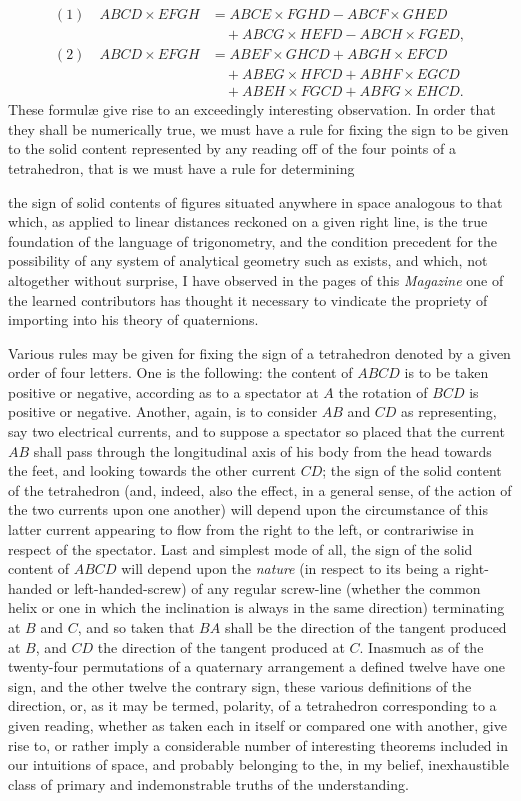 \documentclass[11pt]{article}
\newcommand{\sourcepage}[1]{\marginpar{\scriptsize p.~#1}}
\begin{document}
{{\[
\begin{aligned}
(1)\quad ABCD\times EFGH&=ABCE\times FGHD-ABCF\times GHED\\
&\quad+ABCG\times HEFD-ABCH\times FGED,\\
(2)\quad ABCD\times EFGH&=ABEF\times GHCD+ABGH\times EFCD\\
&\quad+ABEG\times HFCD+ABHF\times EGCD\\
&\quad+ABEH\times FGCD+ABFG\times EHCD.
\end{aligned}
\]
These formulæ give rise to an exceedingly interesting observation. In order that they shall be numerically true, we must have a rule for fixing the sign to be given to the solid content represented by any reading off of the four points of a tetrahedron, that is we must have a rule for determining

\sourcepage{391}
the sign of solid contents of figures situated anywhere in space analogous to that which, as applied to linear distances reckoned on a given right line, is the true foundation of the language of trigonometry, and the condition precedent for the possibility of any system of analytical geometry such as exists, and which, not altogether without surprise, I have observed in the pages of this \emph{Magazine} one of the learned contributors has thought it necessary to vindicate the propriety of importing into his theory of quaternions.

Various rules may be given for fixing the sign of a tetrahedron denoted by a given order of four letters. One is the following: the content of $ABCD$ is to be taken positive or negative, according as to a spectator at $A$ the rotation of $BCD$ is positive or negative. Another, again, is to consider $AB$ and $CD$ as representing, say two electrical currents, and to suppose a spectator so placed that the current $AB$ shall pass through the longitudinal axis of his body from the head towards the feet, and looking towards the other current $CD$; the sign of the solid content of the tetrahedron (and, indeed, also the effect, in a general sense, of the action of the two currents upon one another) will depend upon the circumstance of this latter current appearing to flow from the right to the left, or contrariwise in respect of the spectator. Last and simplest mode of all, the sign of the solid content of $ABCD$ will depend upon the \emph{nature} (in respect to its being a right-handed or left-handed-screw) of any regular screw-line (whether the common helix or one in which the inclination is always in the same direction) terminating at $B$ and $C$, and so taken that $BA$ shall be the direction of the tangent produced at $B$, and $CD$ the direction of the tangent produced at $C$. Inasmuch as of the twenty-four permutations of a quaternary arrangement a defined twelve have one sign, and the other twelve the contrary sign, these various definitions of the direction, or, as it may be termed, polarity, of a tetrahedron corresponding to a given reading, whether as taken each in itself or compared one with another, give rise to, or rather imply a considerable number of interesting theorems included in our intuitions of space, and probably belonging to the, in my belief, inexhaustible class of primary and indemonstrable truths of the understanding.

}}
\end{document}
